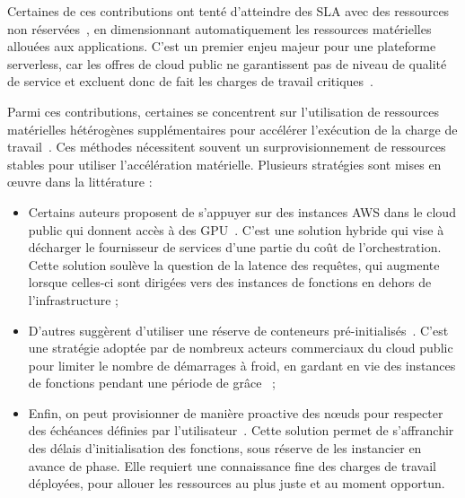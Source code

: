 Certaines de ces contributions ont tenté d'atteindre des \gls{SLA} avec des ressources non réservées~\cite{gujaratiSwayamDistributedAutoscaling2017, zhangMArkExploitingCloud, mampageDeadlineawareDynamicResource2021, singhviAtollScalableLowLatency2021, handaoui2020releaser, handaoui2020salamander, yallesRISCLESSReinforcementLearning}, en dimensionnant automatiquement les ressources matérielles allouées aux applications. C'est un premier enjeu majeur pour une plateforme serverless, car les offres de cloud public ne garantissent pas de niveau de qualité de service et excluent donc de fait les charges de travail critiques~\cite{elsakhawyFaaS2FFrameworkDefining2020}.

Parmi ces contributions, certaines se concentrent sur l'utilisation de ressources matérielles hétérogènes supplémentaires pour accélérer l'exécution de la charge de travail~\cite{zhangMArkExploitingCloud, lingPigeonDynamicEfficient2019, yangINFlessNativeServerless2022}. Ces méthodes nécessitent souvent un surprovisionnement de ressources stables pour utiliser l'accélération matérielle. Plusieurs stratégies sont mises en œuvre dans la littérature :

\begin{itemize}
    \item Certains auteurs proposent de s'appuyer sur des instances \gls{AWS} dans le cloud public qui donnent accès à des \gls{GPU}~\cite{zhangMArkExploitingCloud}. C'est une solution hybride qui vise à décharger le fournisseur de services d'une partie du coût de l'orchestration. Cette solution soulève la question de la latence des requêtes, qui augmente lorsque celles-ci sont dirigées vers des instances de fonctions en dehors de l'infrastructure ;
    \item D'autres suggèrent d'utiliser une réserve de conteneurs pré-initialisés~\cite{lingPigeonDynamicEfficient2019}. C'est une stratégie adoptée par de nombreux acteurs commerciaux du cloud public pour limiter le nombre de démarrages à froid, en gardant en vie des instances de fonctions pendant une période de grâce~\cite{vahidiniaColdStartServerless2020} ;
    \item Enfin, on peut provisionner de manière proactive des nœuds pour respecter des échéances définies par l'utilisateur~\cite{singhviAtollScalableLowLatency2021}. Cette solution permet de s'affranchir des délais d'initialisation des fonctions, sous réserve de les instancier en avance de phase. Elle requiert une connaissance fine des charges de travail déployées, pour allouer les ressources au plus juste et au moment opportun.
\end{itemize}

